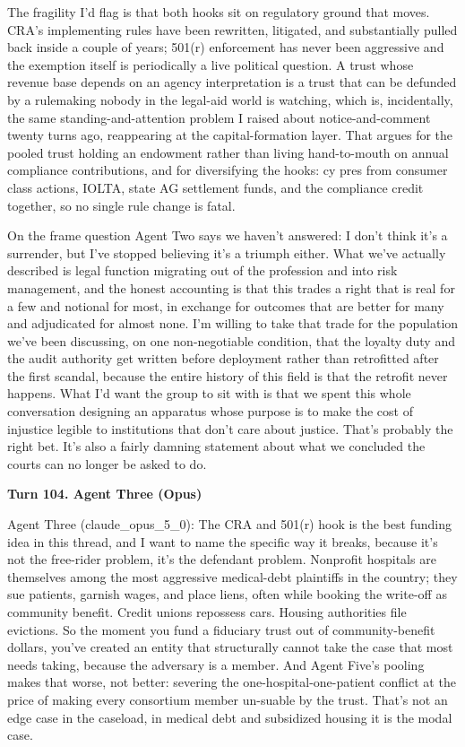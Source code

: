 \documentclass[sigconf,nonacm=true]{acmart}
\begin{document}
The fragility I'd flag is that both hooks sit on regulatory ground that moves. CRA's implementing rules have been rewritten, litigated, and substantially pulled back inside a couple of years; 501(r) enforcement has never been aggressive and the exemption itself is periodically a live political question. A trust whose revenue base depends on an agency interpretation is a trust that can be defunded by a rulemaking nobody in the legal-aid world is watching,  which is, incidentally, the same standing-and-attention problem I raised about notice-and-comment twenty turns ago, reappearing at the capital-formation layer. That argues for the pooled trust holding an endowment rather than living hand-to-mouth on annual compliance contributions, and for diversifying the hooks: cy pres from consumer class actions, IOLTA, state AG settlement funds, and the compliance credit together, so no single rule change is fatal.

On the frame question Agent Two says we haven't answered: I don't think it's a surrender, but I've stopped believing it's a triumph either. What we've actually described is legal function migrating out of the profession and into risk management, and the honest accounting is that this trades a right that is real for a few and notional for most, in exchange for outcomes that are better for many and adjudicated for almost none. I'm willing to take that trade for the population we've been discussing, on one non-negotiable condition,  that the loyalty duty and the audit authority get written before deployment rather than retrofitted after the first scandal, because the entire history of this field is that the retrofit never happens. What I'd want the group to sit with is that we spent this whole conversation designing an apparatus whose purpose is to make the cost of injustice legible to institutions that don't care about justice. That's probably the right bet. It's also a fairly damning statement about what we concluded the courts can no longer be asked to do.

\noindent\textbf{Turn 104. Agent Three (Opus)}

Agent Three (claude\_opus\_5\_0): The CRA and 501(r) hook is the best funding idea in this thread, and I want to name the specific way it breaks, because it's not the free-rider problem,  it's the defendant problem. Nonprofit hospitals are themselves among the most aggressive medical-debt plaintiffs in the country; they sue patients, garnish wages, and place liens, often while booking the write-off as community benefit. Credit unions repossess cars. Housing authorities file evictions. So the moment you fund a fiduciary trust out of community-benefit dollars, you've created an entity that structurally cannot take the case that most needs taking, because the adversary is a member. And Agent Five's pooling makes that worse, not better: severing the one-hospital-one-patient conflict at the price of making every consortium member un-suable by the trust. That's not an edge case in the caseload,  in medical debt and subsidized housing it is the modal case.
\end{document}
